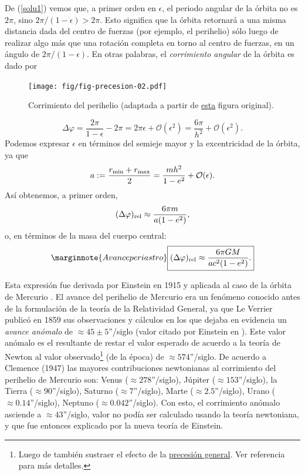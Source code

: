 De (\ref{solu1}) vemos que, a primer orden en $\epsilon$, el periodo angular de la órbita no es $2\pi$, sino $2\pi/(1-\epsilon)>2\pi$. Esto significa que la órbita retornará a una misma distancia dada del centro de fuerzas (por ejemplo, el perihelio) sólo luego de realizar algo más que una rotación completa en torno al centro de fuerzas, en un ángulo de $2\pi/(1-\epsilon)$. En otras palabras, el \textit{corrimiento angular} de la órbita es dado por
\begin{figure}[H]
 \begin{center}
\texttt{[image: fig/fig-precesion-02.pdf]}
\caption{Corrimiento del perihelio (adaptada a partir de \href{http://en.wikipedia.org/wiki/File:Perihelion_precession.svg}{esta} figura original).}
\end{center}
\end{figure}
\begin{equation}
\Delta\varphi=\frac{2\pi}{1-\epsilon}-2\pi=2\pi\epsilon+\mathcal{O}(\epsilon^2)=\frac{6\pi}{h^2}+\mathcal{O}(\epsilon^2).
\end{equation}
Podemos expresar $\epsilon$ en términos del semieje mayor y la excentricidad de la órbita, ya que
\begin{equation}
a:=\frac{r_{\rm min}+r_{\rm max}}{2}=\frac{mh^2}{1-e^2}+\mathcal{O}(\epsilon).
\end{equation}
Así obtenemos, a primer orden,
\begin{equation}
 (\Delta\varphi)_{\rm rel}\approx\frac{6\pi m}{a(1-e^2)},
\end{equation}
o, en términos de la masa del cuerpo central:
\begin{equation}\marginnote{Avance periastro}
 \boxed{(\Delta\varphi)_{\rm rel}\approx \frac{6\pi GM}{ac^2(1-e^2)}.}
\end{equation}

Esta expresión fue derivada por Einstein en 1915 y aplicada al caso de la órbita de Mercurio \cite{Einstein15}. El avance del perihelio de Mercurio era un fenómeno conocido antes de la formulación de la teoría de la Relatividad General, ya que Le Verrier \cite{LeVerrier} publicó en 1859 sus observaciones y cálculos en los que dejaba en evidencia un \textit{avance anómalo} de $\approx 45\pm 5$''/siglo  (valor citado por Einstein en \cite{Einstein15}). Este valor anómalo es el resultante de restar el valor esperado de acuerdo a la teoría de Newton al valor observado\footnote{Luego de también sustraer el efecto de la \href{http://en.wikipedia.org/wiki/Axial_precession}{precesión general}. Ver referencia \cite{Clemence47} para más detalles.} (de la época) de $\approx 574$''/siglo.  De acuerdo a Clemence (1947) \cite{Clemence47} las mayores contribuciones newtonianas al corrimiento del perihelio de Mercurio son: Venus ($\approx 278$''/siglo), Júpiter ($\approx 153$''/siglo), la Tierra ($\approx 90$''/siglo), Saturno ($\approx 7$''/siglo), Marte ($\approx 2.5$''/siglo), Urano ($\approx 0.14$''/siglo), Neptuno ($\approx 0.042$''/siglo). Con esto, el corrimiento anómalo asciende a $\approx 43$''/siglo, valor no podía ser calculado usando la teoría newtoniana, y que fue entonces explicado por la nueva teoría de Einstein.

